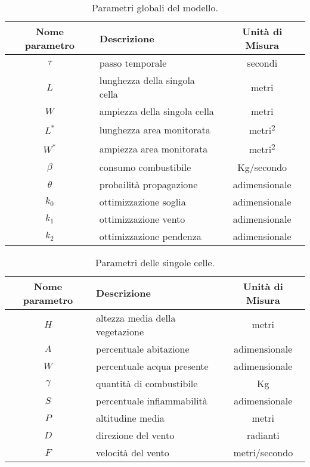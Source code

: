 \documentclass[draft]{article}
\newcommand{\combvar}{Kg}
\begin{document}
\begin{table}
\centering
\begin{tabular}{|c|l|c|}
	\hline
	\textbf{Nome parametro} & \textbf{Descrizione} & \textbf{Unità di Misura}\\
	\hline
	$\tau$ & passo temporale & secondi\\
	$L$ & lunghezza della singola cella & metri\\
	$W$ & ampiezza della singola cella & metri\\
	$L^*$ & lunghezza area monitorata & metri\textsuperscript{2}\\
	$W^*$ & ampiezza area monitorata & metri\textsuperscript{2}\\
	$\beta$ & consumo combustibile & \combvar/secondo\\
	$\theta$ & probailità propagazione & adimensionale\\
	$k_0$ & ottimizzazione soglia & adimensionale\\
	$k_1$ & ottimizzazione vento & adimensionale\\
	$k_2$ & ottimizzazione pendenza & adimensionale\\
	\hline
\end{tabular}
\caption{Parametri globali del modello.}
\label{tab:globals}
\end{table}

\begin{table}
\centering
\begin{tabular}{|c|l|c|}
	\hline
	\textbf{Nome parametro} & \textbf{Descrizione} & \textbf{Unità di Misura}\\
	\hline
	$H$ & altezza media della vegetazione & metri\\
	$A$ & percentuale abitazione & adimensionale\\
	$W$ & percentuale acqua presente & adimensionale\\
	$\gamma$ & quantità di combustibile & \combvar\\
	$S$ & percentuale infiammabilità & adimensionale\\
	$P$ & altitudine media & metri\\
	$D$ & direzione del vento & radianti\\
	$F$ & velocità del vento & metri/secondo\\
	\hline
\end{tabular}
\caption{Parametri delle singole celle.}
\label{tab:params}
\end{table}
\end{document}
